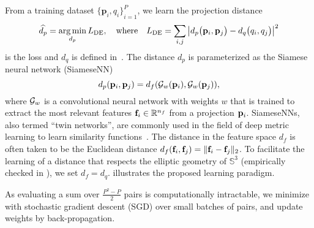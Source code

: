 From a training dataset ${\{ \mathbf{p}_{i}, q_i \}}_{i=1}^{P}$, we learn the projection distance
\begin{equation}
    \widehat{d_p} = \operatorname*{arg\,min}_{d_p} L_\text{DE},
    \quad \text{where} \quad
    L_\text{DE} = \sum_{i,j} \left| d_p\big(\mathbf{p}_{i},\mathbf{p}_{j}\big) - d_q\big(q_i,q_j\big) \right|^2
    \label{eqn:distance-learning}
\end{equation}
is the loss and $d_q$ is defined in~.
The distance $d_p$ is parameterized as the Siamese neural network (SiameseNN)~\cite{chopra2005learning}
\begin{equation*}
    d_p(\mathbf{p}_i, \mathbf{p}_j) = d_f(\mathcal{G}_w(\mathbf{p}_i), \mathcal{G}_w(\mathbf{p}_j)),
\end{equation*}
where $\mathcal{G}_w$ is a convolutional neural network with weights $w$ that is trained to extract the most relevant features $\mathbf{f}_i \in \mathbb{R}^{n_f}$ from a projection $\mathbf{p}_i$.
SiameseNNs, also termed ``twin networks'', are commonly used in the field of deep metric learning to learn similarity functions~\cite{yi2014deep}.
The distance in the feature space $d_f$ is often taken to be the Euclidean distance $d_f(\mathbf{f}_i, \mathbf{f}_j) = \Vert \mathbf{f}_i - \mathbf{f}_j \Vert_2$.
To facilitate the learning of a distance that respects the elliptic geometry of $\mathbb{S}^3$ (empirically checked in ), we set $d_f = d_q$.
 illustrates the proposed learning paradigm.

As evaluating a sum over $\frac{P^2-P}{2}$ pairs is computationally intractable,
we minimize  with stochastic gradient descent (SGD) over small batches of pairs, and update weights by back-propagation.

